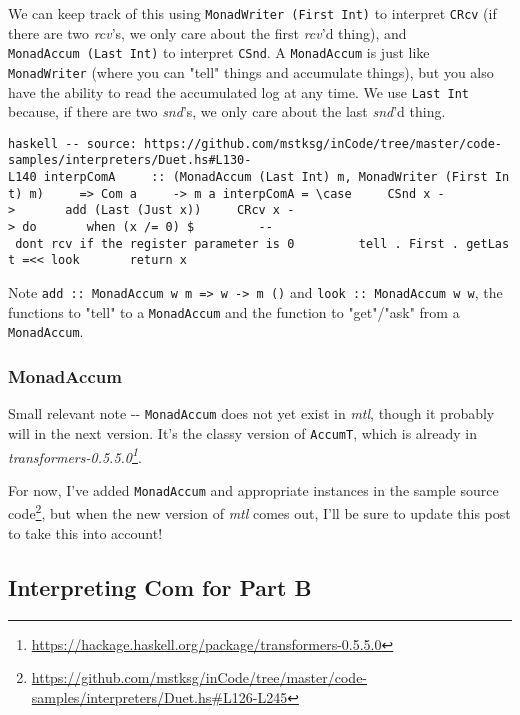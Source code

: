 \documentclass[]{article}
\renewcommand{\href}[2]{#2\footnote{\url{#1}}}
\begin{document}
We can keep track of this using \texttt{MonadWriter\ (First\ Int)} to interpret
\texttt{CRcv} (if there are two \emph{rcv}'s, we only care about the first
\emph{rcv}'d thing), and \texttt{MonadAccum\ (Last\ Int)} to interpret
\texttt{CSnd}. A \texttt{MonadAccum} is just like \texttt{MonadWriter} (where
you can "tell" things and accumulate things), but you also have the ability to
read the accumulated log at any time. We use \texttt{Last\ Int} because, if
there are two \emph{snd}'s, we only care about the last \emph{snd}'d thing.

\texttt{haskell\ -\/-\ source:\ https://github.com/mstksg/inCode/tree/master/code-samples/interpreters/Duet.hs\#L130-L140\ interpComA\ \ \ \ \ ::\ (MonadAccum\ (Last\ Int)\ m,\ MonadWriter\ (First\ Int)\ m)\ \ \ \ \ =\textgreater{}\ Com\ a\ \ \ \ \ -\textgreater{}\ m\ a\ interpComA\ =\ \textbackslash{}case\ \ \ \ \ CSnd\ x\ -\textgreater{}\ \ \ \ \ \ \ add\ (Last\ (Just\ x))\ \ \ \ \ CRcv\ x\ -\textgreater{}\ do\ \ \ \ \ \ \ when\ (x\ /=\ 0)\ \$\ \ \ \ \ \ \ \ \ -\/-\ don\textquotesingle{}t\ rcv\ if\ the\ register\ parameter\ is\ 0\ \ \ \ \ \ \ \ \ tell\ .\ First\ .\ getLast\ =\textless{}\textless{}\ look\ \ \ \ \ \ \ return\ x}

Note
\texttt{add\ ::\ MonadAccum\ w\ m\ =\textgreater{}\ w\ -\textgreater{}\ m\ ()}
and \texttt{look\ ::\ MonadAccum\ w\ w}, the functions to "tell" to a
\texttt{MonadAccum} and the function to "get"/"ask" from a \texttt{MonadAccum}.

\subsubsection{MonadAccum}

Small relevant note -\/- \texttt{MonadAccum} does not yet exist in \emph{mtl},
though it probably will in the next version. It's the classy version of
\texttt{AccumT}, which is already in
\emph{\href{https://hackage.haskell.org/package/transformers-0.5.5.0}{transformers-0.5.5.0}}.

For now, I've added \texttt{MonadAccum} and appropriate instances in the
\href{https://github.com/mstksg/inCode/tree/master/code-samples/interpreters/Duet.hs\#L126-L245}{sample
source code}, but when the new version of \emph{mtl} comes out, I'll be sure to
update this post to take this into account!

\subsection{Interpreting Com for Part B}
\end{document}
